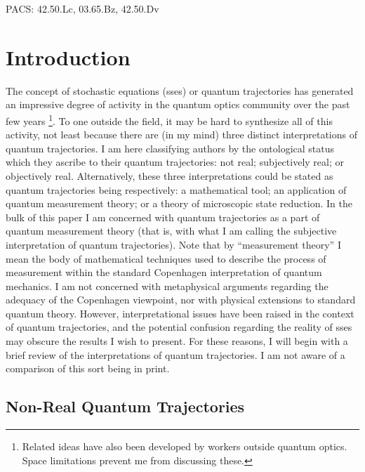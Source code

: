 PACS: 42.50.Lc, 03.65.Bz, 42.50.Dv




\section{Introduction}

The concept of stochastic \sch equations ({\sc sse}s) \cite{DalCasMol92} or quantum
trajectories \cite{Car93b} has generated an impressive degree of activity in the
quantum optics community over the past few years \footnote{Related ideas have also
been developed by workers outside quantum optics. Space limitations prevent me from
discussing these.}. To one outside the field, it may be hard to synthesize all of
this activity, not least because there are (in my mind) three distinct
interpretations of quantum trajectories. I am here classifying authors by the
ontological status which they ascribe to their quantum trajectories: not real;
subjectively real; or objectively real. Alternatively, these three interpretations
could be stated as quantum trajectories being respectively: a mathematical tool; an
application of quantum measurement theory; or a theory of microscopic state
reduction. In the bulk of this paper I am concerned with quantum trajectories as a
part of quantum measurement theory (that is, with what I am calling the subjective
interpretation of quantum trajectories). Note that by ``measurement theory'' I mean
the body of mathematical techniques used to describe the process of measurement
within the standard Copenhagen interpretation \cite{Boh58,Hei59} of quantum
mechanics. I am not concerned with  metaphysical arguments regarding the adequacy of
the Copenhagen viewpoint, nor with physical extensions to standard quantum theory.
However, interpretational issues have been raised in the context of quantum
trajectories, and the potential confusion regarding the reality of {\sc sse}s may
obscure the results I wish to present. For these reasons, I will begin with a brief
review of the interpretations of quantum trajectories. I am not aware of a
comparison of this sort being in print.

\subsection{Non-Real Quantum Trajectories}

